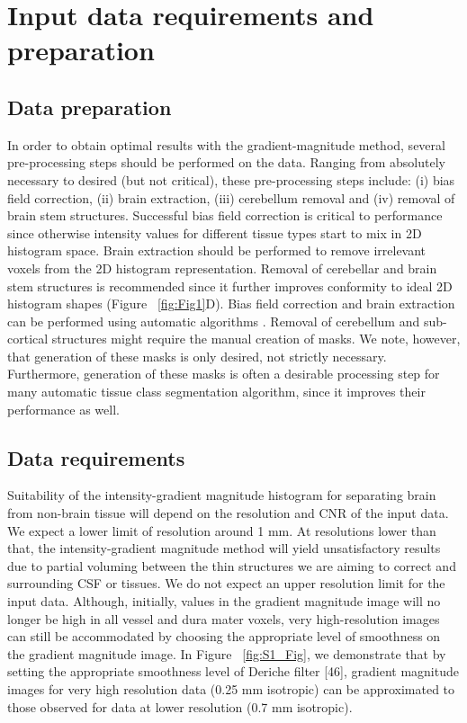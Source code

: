\section{Input data requirements and preparation}
\label{sec:DataRequirements}
\subsection{Data preparation}
In order to obtain optimal results with the gradient-magnitude method, several pre-processing steps should be performed on the data. Ranging from absolutely necessary to desired (but not critical), these pre-processing steps include: (i) bias field correction, (ii) brain extraction, (iii) cerebellum removal and (iv) removal of brain stem structures. Successful bias field correction is critical to performance since otherwise intensity values for different tissue types start to mix in 2D histogram space. Brain extraction should be performed to remove irrelevant voxels from the 2D histogram representation. Removal of cerebellar and brain stem structures is recommended since it further improves conformity to ideal 2D histogram shapes (Figure ~\ref{fig:Fig1}D). Bias field correction and brain extraction can be performed using automatic algorithms \parencite{Smith2002, Ashburner2005}. Removal of cerebellum and sub-cortical structures might require the manual creation of masks. We note, however, that generation of these masks is only desired, not strictly necessary. Furthermore, generation of these masks is often a desirable processing step for many automatic tissue class segmentation algorithm, since it improves their performance as well.

\subsection{Data requirements}
Suitability of the intensity-gradient magnitude histogram for separating brain from non-brain tissue will depend on the resolution and CNR of the input data. We expect a lower limit of resolution around 1 mm. At resolutions lower than that, the intensity-gradient magnitude method will yield unsatisfactory results due to partial voluming between the thin structures we are aiming to correct and surrounding CSF or tissues. We do not expect an upper resolution limit for the input data. Although, initially, values in the gradient magnitude image will no longer be high in all vessel and dura mater voxels, very high-resolution images can still be accommodated by choosing the appropriate level of smoothness on the gradient magnitude image. In Figure ~\ref{fig:S1_Fig}, we demonstrate that by setting the appropriate smoothness level of Deriche filter [46], gradient magnitude images for very high resolution data (0.25 mm isotropic) \parencite{250micron_data, Lusebrink2017} can be approximated to those observed for data at lower resolution (0.7 mm isotropic).

